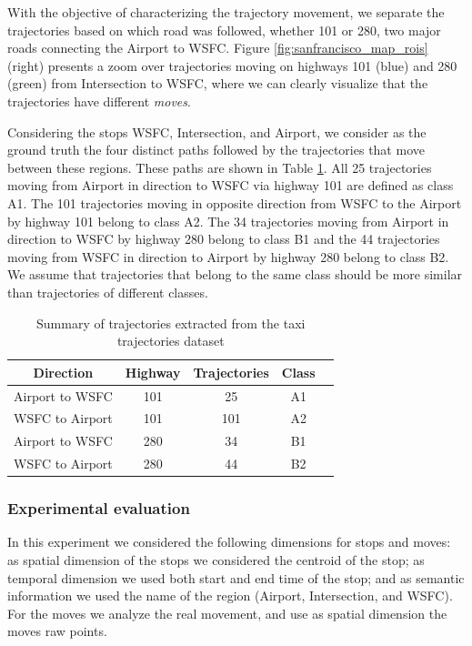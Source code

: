 \documentclass[12pt]{article}
\begin{document}
With the objective of characterizing the trajectory movement, we separate the trajectories based on which road was followed, whether 101 or 280, two major roads {connecting the Airport to} WSFC. {Figure \ref{fig:sanfrancisco_map_rois}} (right) presents a zoom over trajectories moving on highways 101 (blue) and 280 (green) from Intersection to WSFC, where we can clearly visualize that the trajectories have different \emph{moves}.

Considering the stops WSFC, Intersection, and Airport, we consider as the ground truth the four distinct paths followed by the trajectories that move between these regions. These paths are shown in Table \ref{tab:san_francisco_dataset}. All 25 trajectories moving from Airport in direction to WSFC via highway 101 are defined as class A1. The 101 trajectories moving in opposite direction from WSFC to the Airport by highway 101 belong to class A2. The 34 trajectories moving from Airport in direction to WSFC by highway 280 belong to class B1 and the 44 trajectories moving from WSFC in direction to Airport by highway 280 belong to class B2. We assume that trajectories that belong to the same class should be more similar than trajectories of different classes.

\begin{table}[h]
\scriptsize
  \centering
  \begin{tabular}{|c|c|c|c|c|}
  	\hline
 Direction & Highway & Trajectories & Class \\
  	\hline
 Airport to WSFC & 101 & 25 & A1\\
 WSFC to Airport & 101 & 101 & A2\\
 Airport to WSFC & 280 & 34 & B1\\
 WSFC to Airport & 280 & 44 & B2\\
    \hline
  \end{tabular}
  \caption{Summary of trajectories extracted from the taxi trajectories dataset}
  \label{tab:san_francisco_dataset}
\end{table}

\subsubsection{Experimental evaluation}

In this experiment we considered the following dimensions for stops and moves: as spatial dimension of the stops we considered the centroid of the stop; as temporal dimension we used both start and end time of the stop; and as semantic information we used the name of the region (Airport, Intersection, and WSFC). For the moves we analyze the real movement, and use as spatial dimension the moves raw points.
\end{document}
